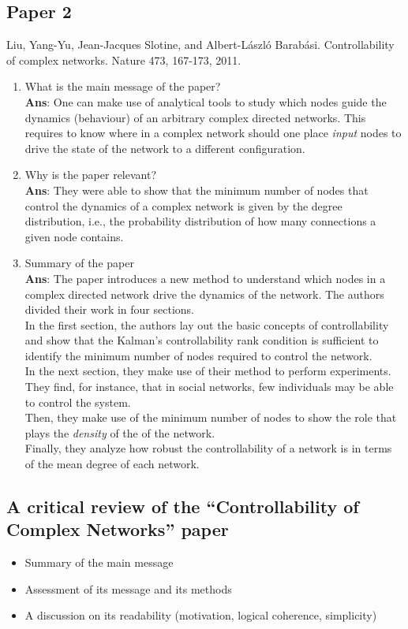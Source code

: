 \documentclass[11pt]{article}
\begin{document}
\subsection*{Paper 2}
Liu, Yang-Yu, Jean-Jacques Slotine, and Albert-László Barabási. Controllability of complex networks. Nature 473, 167-173, 2011.
\begin{enumerate}[label=(\alph*)]
	\item What is the main message of the paper? \\ \textbf{Ans}: One can make use of analytical tools to study which nodes guide the dynamics (behaviour) of an arbitrary complex directed networks. This requires to know where in a complex network should one place \textit{input} nodes to drive the state of the network to a different configuration. 
	\item Why is the paper relevant? \\ \textbf{Ans}: They were able to show that the minimum number of nodes that control the dynamics of a complex network is given by the degree distribution, i.e., the probability distribution of how many connections a given node contains.
	\item Summary of the paper \\ \textbf{Ans}: The paper introduces a new method to understand which nodes in a complex directed network drive the dynamics of the network. The authors divided their work in four sections. \\ In the first section, the authors lay out the basic concepts of controllability and show that the Kalman's controllability rank condition is sufficient to identify the minimum number of nodes required to control the network.\\ In the next section, they make use of their method to perform experiments. They find, for instance, that in social networks, few individuals may be able to control the system.\\Then, they make use of the minimum number of nodes to show the role that plays the \textit{density} of the of the network.\\Finally, they analyze how robust the controllability of a network is in terms of the mean degree of each network.
\end{enumerate}

\subsection*{A critical review of the ``Controllability of Complex Networks'' paper}
\begin{itemize}
	\item Summary of the main message
	\item Assessment of its message and its methods
	\item A discussion on its readability (motivation, logical coherence, simplicity)   
\end{itemize}
\end{document}
